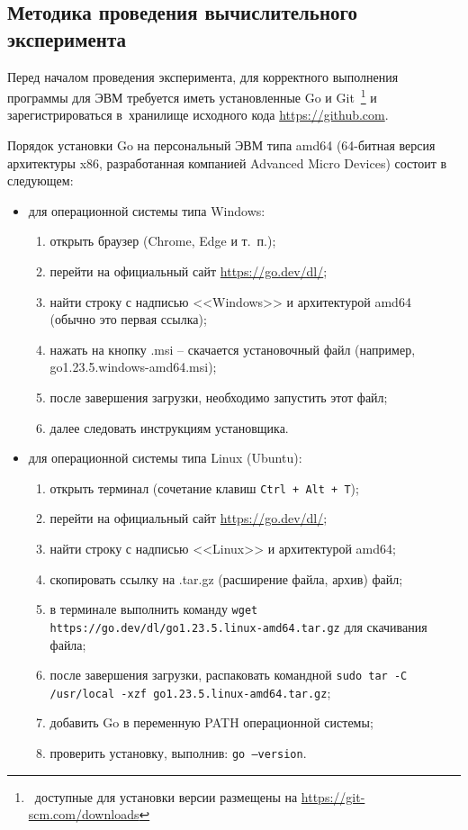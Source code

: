 \subsection{Методика проведения вычислительного эксперимента}\label{sec:ch3/sec2sub2}

Перед началом проведения эксперимента, для корректного выполнения программы для ЭВМ требуется иметь установленные Go и Git\ \footnote{\  доступные для установки версии размещены на \url{https://git-scm.com/downloads}} и зарегистрироваться в~хранилище исходного кода \url{https://github.com}.

Порядок установки Go на персональный ЭВМ типа amd64 (64-битная версия архитектуры x86, разработанная компанией Advanced Micro Devices) состоит в следующем:
\begin{itemize}[beginpenalty=10000, midpenalty=10000, wide=\parindent, leftmargin=0pt]
	\item для операционной системы типа Windows:
		\begin{enumerate}[beginpenalty=10000, midpenalty=10000, wide=\parindent, leftmargin=0pt]
			\item открыть браузер (Chrome, Edge и т.\ п.);
			\item перейти на официальный сайт \url{https://go.dev/dl/};
			\item найти строку с надписью <<Windows>> и архитектурой amd64 (обычно это первая ссылка);
			\item нажать на кнопку .msi -- скачается установочный файл (например, go1.23.5.windows-amd64.msi);
			\item после завершения загрузки, необходимо запустить этот файл;
			\item далее следовать инструкциям установщика.
		\end{enumerate}
	\item для операционной системы типа Linux (Ubuntu):
		\begin{enumerate}[beginpenalty=10000, midpenalty=10000, wide=\parindent, leftmargin=0pt]
			\item открыть терминал (сочетание клавиш \texttt{Ctrl + Alt + T});
			\item перейти на официальный сайт \url{https://go.dev/dl/};
			\item найти строку с надписью <<Linux>> и архитектурой amd64;
			\item скопировать ссылку на .tar.gz (расширение файла, архив) файл;
			\item в терминале выполнить команду \texttt{wget \\ https://go.dev/dl/go1.23.5.linux-amd64.tar.gz} для скачивания файла;
			\item после завершения загрузки, распаковать командной \texttt{sudo tar -C /usr/local -xzf go1.23.5.linux-amd64.tar.gz};
			\item добавить Go в переменную PATH операционной системы;
			\item проверить установку, выполнив:
			\texttt{go --version}.
		\end{enumerate}
\end{itemize}

